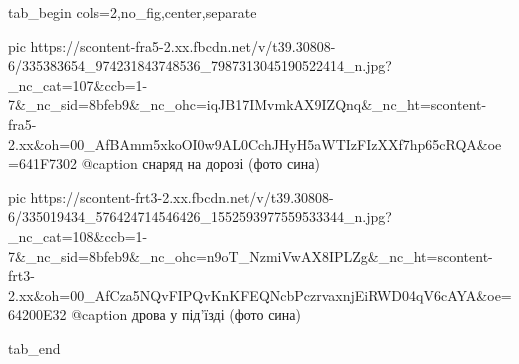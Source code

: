  
 
 
 
 


\ifcmt
  tab_begin cols=2,no_fig,center,separate

     pic https://scontent-fra5-2.xx.fbcdn.net/v/t39.30808-6/335383654_974231843748536_7987313045190522414_n.jpg?_nc_cat=107&ccb=1-7&_nc_sid=8bfeb9&_nc_ohc=iqJB17IMvmkAX9IZQnq&_nc_ht=scontent-fra5-2.xx&oh=00_AfBAmm5xkoOI0w9AL0CchJHyH5aWTIzFIzXXf7hp65cRQA&oe=641F7302
		 @caption снаряд на дорозі (фото сина)

     pic https://scontent-frt3-2.xx.fbcdn.net/v/t39.30808-6/335019434_576424714546426_1552593977559533344_n.jpg?_nc_cat=108&ccb=1-7&_nc_sid=8bfeb9&_nc_ohc=n9oT_NzmiVwAX8IPLZg&_nc_ht=scontent-frt3-2.xx&oh=00_AfCza5NQvFIPQvKnKFEQNcbPczrvaxnjEiRWD04qV6cAYA&oe=64200E32
		 @caption дрова у під'їзді (фото сина)

  tab_end
\fi

